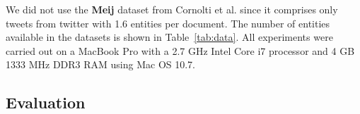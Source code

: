 We did not use the \textbf{Meij} dataset from Cornolti et al. since it comprises only tweets from twitter with 1.6 entities per document. The number of entities available in the datasets is shown in Table~\ref{tab:data}.
All experiments were carried out on a MacBook Pro with a 2.7 GHz Intel Core i7 processor and 4 GB 1333 MHz DDR3 RAM using Mac OS 10.7. 


\begin{table}[htb!]
\centering

\caption{Test corpora specification including the number of documents (\#Doc.) and the number of named entities (\#Ent.) per dataset}
\label{tab:data}

\end{table}



\subsection{Evaluation}
\label{results}



